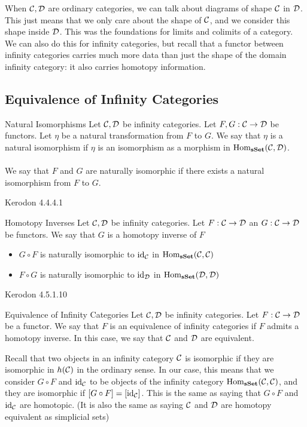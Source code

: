 \documentclass[a4paper]{article}
\begin{document}
When $\mathcal{C},\mathcal{D}$ are ordinary categories, we can talk about diagrams of shape $\mathcal{C}$ in $\mathcal{D}$. This just means that we only care about the shape of $\mathcal{C}$, and we consider this shape inside $\mathcal{D}$. This was the foundations for limits and colimits of a category. We can also do this for infinity categories, but recall that a functor between infinity categories carries much more data than just the shape of the domain infinity category: it also carries homotopy information. \\

\subsection{Equivalence of Infinity Categories}
\begin{defn}{Natural Isomorphisms}{} Let $\mathcal{C},\mathcal{D}$ be infinity categories. Let $F,G:\mathcal{C}\to\mathcal{D}$ be functors. Let $\eta$ be a natural transformation from $F$ to $G$. We say that $\eta$ is a natural isomorphism if $\eta$ is an isomorphism as a morphism in $\operatorname{Hom}_\bold{sSet}(\mathcal{C},\mathcal{D})$. \\~\\

We say that $F$ and $G$ are naturally isomorphic if there exists a natural isomorphism from $F$ to $G$. 
\end{defn}

Kerodon 4.4.4.1

\begin{defn}{Homotopy Inverses}{} Let $\mathcal{C},\mathcal{D}$ be infinity categories. Let $F:\mathcal{C}\to\mathcal{D}$ an $G:\mathcal{C}\to\mathcal{D}$ be functors. We say that $G$ is a homotopy inverse of $F$ 
\begin{itemize}
\item $G\circ F$ is naturally isomorphic to $\text{id}_{\mathcal{C}}$ in $\operatorname{Hom}_\bold{sSet}(\mathcal{C},\mathcal{C})$
\item $F\circ G$ is naturally isomorphic to $\text{id}_{\mathcal{D}}$ in $\operatorname{Hom}_\bold{sSet}(\mathcal{D},\mathcal{D})$
\end{itemize}
\end{defn}

Kerodon 4.5.1.10

\begin{defn}{Equivalence of Infinity Categories}{} Let $\mathcal{C},\mathcal{D}$ be infinity categories. Let $F:\mathcal{C}\to\mathcal{D}$ be a functor. We say that $F$ is an equivalence of infinity categories if $F$ admits a homotopy inverse. In this case, we say that $\mathcal{C}$ and $\mathcal{D}$ are equivalent. 
\end{defn}

Recall that two objects in an infinity category $\mathcal{C}$ is isomorphic if they are isomorphic in $h(\mathcal{C})$ in the ordinary sense. In our case, this means that we consider $G\circ F$ and $\text{id}_{\mathcal{C}}$ to be objects of the infinity category $\operatorname{Hom}_\bold{sSet}(\mathcal{C},\mathcal{C})$, and they are isomorphic if $[G\circ F]=[\text{id}_{\mathcal{C}}]$. This is the same as saying that $G\circ F$ and $\text{id}_{\mathcal{C}}$ are homotopic. (It is also the same as saying $\mathcal{C}$ and $\mathcal{D}$ are homotopy equivalent as simplicial sets)
\end{document}
